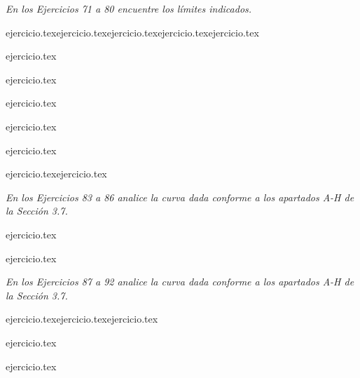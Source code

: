 \noindent \textit{En los Ejercicios 71 a 80 encuentre los límites indicados.}

\begin{enumerate}
    \setcounter{enumi}{70}
    \begin{minipage}{0.45\textwidth}
    {ejercicio.tex}{ejercicio.tex}{ejercicio.tex}{ejercicio.tex}{ejercicio.tex}\end{minipage}%
    \begin{minipage}{0.45\textwidth}
    \setcounter{enumi}{71}
    {ejercicio.tex}\addtocounter{enumi}{1}
    {ejercicio.tex}\addtocounter{enumi}{1}
    {ejercicio.tex}\addtocounter{enumi}{1}
    {ejercicio.tex}\addtocounter{enumi}{1}
    {ejercicio.tex}\end{minipage}
\end{enumerate}

\begin{enumerate}
    \setcounter{enumi}{80}
    {ejercicio.tex}{ejercicio.tex}\end{enumerate}

\vspace{1em}
\noindent \textit{En los Ejercicios 83 a 86 analice la curva dada conforme a los apartados A-H de la Sección 3.7.}

\begin{enumerate}
    \setcounter{enumi}{82}
    \begin{minipage}{0.45\textwidth}
    {ejercicio.tex}\end{minipage}%
    \begin{minipage}{0.45\textwidth}
    {ejercicio.tex}\end{minipage}
\end{enumerate}

\vspace{1em}
\noindent \textit{En los Ejercicios 87 a 92 analice la curva dada conforme a los apartados A-H de la Sección 3.7.}

\begin{enumerate}
    \setcounter{enumi}{86}
    \begin{minipage}{0.3\textwidth}
    {ejercicio.tex}{ejercicio.tex}{ejercicio.tex}\end{minipage}%
    \begin{minipage}{0.3\textwidth}
    \setcounter{enumi}{87}
    {ejercicio.tex}\addtocounter{enumi}{1}
    {ejercicio.tex}\end{minipage}
\end{enumerate}

